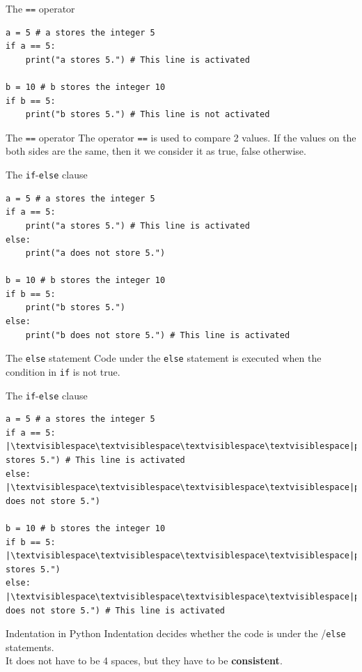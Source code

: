 \documentclass[dvipsnames, svgnames, x11names]{beamer}
\begin{document}
\begin{frame}[fragile]{The \texttt{==} operator}
\begin{verbatim}
a = 5 # a stores the integer 5
if a == 5:
    print("a stores 5.") # This line is activated
    
b = 10 # b stores the integer 10
if b == 5:
    print("b stores 5.") # This line is not activated
\end{verbatim}
\begin{block}{The \texttt{==} operator}
The operator \texttt{==} is used to compare 2 values. If the values on the both sides are the same, then it we consider it as true, false otherwise.
\end{block}
\end{frame}

\begin{frame}[fragile]{The \texttt{if}-\texttt{else} clause}
\begin{verbatim}
a = 5 # a stores the integer 5
if a == 5:
    print("a stores 5.") # This line is activated
else:
    print("a does not store 5.") 
    
b = 10 # b stores the integer 10
if b == 5:
    print("b stores 5.")
else:
    print("b does not store 5.") # This line is activated
\end{verbatim}
\begin{block}{The \texttt{else} statement}
Code under the \texttt{else} statement is executed when the condition in \texttt{if} is not true.
\end{block}
\end{frame}

\begin{frame}[fragile]{The \texttt{if}-\texttt{else} clause}
\begin{verbatim}
a = 5 # a stores the integer 5
if a == 5:
|\textvisiblespace\textvisiblespace\textvisiblespace\textvisiblespace|print("a stores 5.") # This line is activated
else:
|\textvisiblespace\textvisiblespace\textvisiblespace\textvisiblespace|print("a does not store 5.") 
    
b = 10 # b stores the integer 10
if b == 5:
|\textvisiblespace\textvisiblespace\textvisiblespace\textvisiblespace|print("b stores 5.")
else:
|\textvisiblespace\textvisiblespace\textvisiblespace\textvisiblespace|print("b does not store 5.") # This line is activated
\end{verbatim}
\begin{block}{Indentation in Python}
Indentation decides whether the code is under the /\texttt{else} statements.\\
It does not have to be 4 spaces, but they have to be \textbf{consistent}.
\end{block}
\end{frame}
\end{document}

